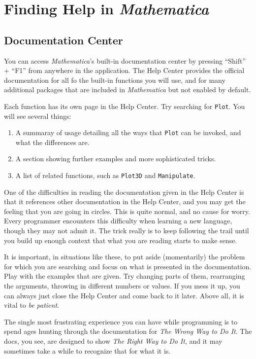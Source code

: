 \chapter{Finding Help in \emph{Mathematica} }
\label{chap:Help}

\section{Documentation Center}

You can access \emph{Mathematica}'s built-in documentation center by pressing ``Shift'' + ``F1'' from anywhere in the application. The Help Center provides the official documentation for all fo the built-in functions you will use, and for many additional packages that are included in \emph{Mathematica} but not enabled by default.

Each function has its own page in the Help Center. Try searching for \texttt{Plot}. You will see several things: 
\begin{enumerate}
	   \item A summaray of usage detailing all the ways that \texttt{Plot} can be invoked, and what the differences are.
	   \item A section showing further examples and more sophisticated tricks.
	   \item A list of related functions, such as \texttt{Plot3D} and \texttt{Manipulate}.
\end{enumerate}
One of the difficulties in reading the documentation given in the Help Center is that it references other documentation in the Help Center, and you may get the feeling that you are going in circles. This is quite normal, and no cause for worry. Every programmer encounters this difficulty when learning a new language, though they may not admit it. The trick really is to keep following the trail until you build up enough context that what you are reading starts to make sense.

It is important, in situations like these, to put aside (momentarily) the problem for which you are searching and focus on what is presented in the documentation. Play with the examples that are given. Try changing parts of them, rearranging the arguments, throwing in different numbers or values. If you mess it up, you can always just close the Help Center and come back to it later. Above all, it is vital to \emph{be patient}. 

The single most frustrating experience you can have while programming is to spend ages hunting through the documentation for \emph{The Wrong Way to Do It}. The docs, you see, are designed to show \emph{The Right Way to Do It}, and it may sometimes take a while to recognize that for what it is.

